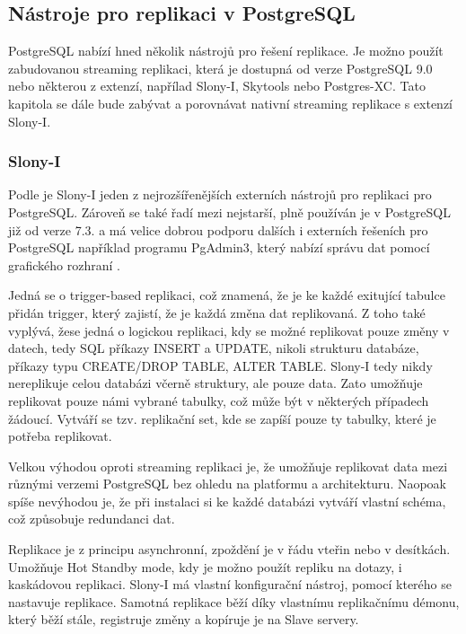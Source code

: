       \subsection{Nástroje pro replikaci v PostgreSQL}

PostgreSQL nabízí hned několik nástrojů pro řešení replikace. Je možno použít zabudovanou streaming replikaci, která je dostupná od verze PostgreSQL 9.0 nebo některou z extenzí, napřílad Slony-I, Skytools nebo Postgres-XC. Tato kapitola se dále bude zabývat a porovnávat nativní streaming replikace s extenzí Slony-I.

      \subsubsection{Slony-I}
      \label{kSlony}

Podle \cite{Boszormenyi2013} je Slony-I jeden z nejrozšířenějších externích nástrojů pro replikaci pro PostgreSQL. Zároveň se také řadí mezi nejstarší, plně používán je v PostgreSQL již od verze 7.3. a má velice dobrou podporu dalších i externích řešeních pro PostgreSQL například programu PgAdmin3, který nabízí správu dat pomocí grafického rozhraní \citep{Boszormenyi2013}.

Jedná se o trigger-based replikaci, což znamená, že je ke každé exitující tabulce přidán trigger, který zajistí, že je každá změna dat replikovaná. Z toho také vyplývá, žese jedná o logickou replikaci, kdy se možné replikovat pouze změny v datech, tedy SQL příkazy INSERT a UPDATE, nikoli strukturu databáze, příkazy typu CREATE/DROP TABLE, ALTER TABLE. Slony-I tedy nikdy nereplikuje celou databázi včerně struktury, ale pouze data. Zato umožňuje replikovat pouze námi vybrané tabulky, což může být v některých případech žádoucí. Vytváří se tzv. replikační set, kde se zapíší pouze ty tabulky, které je potřeba replikovat. 

Velkou výhodou oproti streaming replikaci je, že umožňuje replikovat data mezi různými verzemi PostgreSQL bez ohledu na platformu a architekturu. Naopoak spíše nevýhodou je, že při instalaci si ke každé databázi vytváří vlastní schéma, což způsobuje redundanci dat. 

Replikace je z principu asynchronní, zpoždění je v řádu vteřin nebo v desítkách. Umožňuje Hot Standby mode, kdy je možno použít repliku na dotazy, i kaskádovou replikaci. Slony-I má vlastní konfigurační nástroj, pomocí kterého se nastavuje replikace. Samotná replikace běží díky vlastnímu replikačnímu démonu, který běží stále, registruje změny a kopíruje je na Slave servery.

